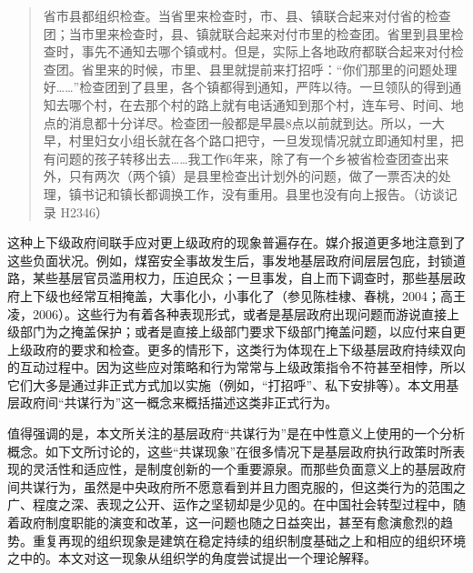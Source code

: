 \documentclass[12pt,a4paper]{article}
\begin{document}
\begin{quotation}\kaifont\noindent 省市县都组织检查。当省里来检查时，市、县、镇联合起来对付省的检查团；当市里来检查时，县、镇就联合起来对付市里的检查团。省里到县里检查时，事先不通知去哪个镇或村。但是，实际上各地政府都联合起来对付检查团。省里来的时候，市里、县里就提前来打招呼：“你们那里的问题处理好……”检查团到了县里，各个镇都得到通知，严阵以待。一旦领队的得到通知去哪个村，在去那个村的路上就有电话通知到那个村，连车号、时间、地点的消息都十分详尽。检查团一般都是早晨8点以前就到达。所以，一大早，村里妇女小组长就在各个路口把守，一旦发现情况就立即通知村里，把有问题的孩子转移出去……我工作6年来，除了有一个乡被省检查团查出来外，只有两次（两个镇）是县里检查出计划外的问题，做了一票否决的处理，镇书记和镇长都调换工作，没有重用。县里也没有向上报告。（访谈记录 H2346）\end{quotation}



这种上下级政府间联手应对更上级政府的现象普遍存在。媒介报道更多地注意到了这些负面状况。例如，煤窑安全事故发生后，事发地基层政府间层层包庇，封锁道路，某些基层官员滥用权力，压迫民众；一旦事发，自上而下调查时，那些基层政府上下级也经常互相掩盖，大事化小，小事化了（参见陈桂棣、春桃，2004；高王凌，2006）。这些行为有着各种表现形式，或者是基层政府出现问题而游说直接上级部门为之掩盖保护；或者是直接上级部门要求下级部门掩盖问题，以应付来自更上级政府的要求和检查。更多的情形下，这类行为体现在上下级基层政府持续双向的互动过程中。因为这些应对策略和行为常常与上级政策指令不符甚至相悖，所以它们大多是通过非正式方式加以实施（例如，“打招呼”、私下安排等）。本文用基层政府间“共谋行为”这一概念来概括描述这类非正式行为。



值得强调的是，本文所关注的基层政府“共谋行为”是在中性意义上使用的一个分析概念。如下文所讨论的，这些“共谋现象”在很多情况下是基层政府执行政策时所表现的灵活性和适应性，是制度创新的一个重要源泉。而那些负面意义上的基层政府间共谋行为，虽然是中央政府所不愿意看到并且力图克服的，但这类行为的范围之广、程度之深、表现之公开、运作之坚韧却是少见的。在中国社会转型过程中，随着政府制度职能的演变和改革，这一问题也随之日益突出，甚至有愈演愈烈的趋势。重复再现的组织现象是建筑在稳定持续的组织制度基础之上和相应的组织环境之中的。本文对这一现象从组织学的角度尝试提出一个理论解释。
\end{document}

